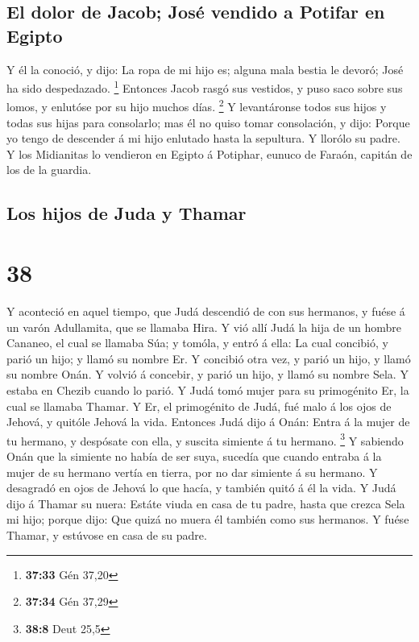 \hypertarget{el-dolor-de-jacob-josuxe9-vendido-a-potifar-en-egipto}{%
\subsection{El dolor de Jacob; José vendido a Potifar en
Egipto}\label{el-dolor-de-jacob-josuxe9-vendido-a-potifar-en-egipto}}

 Y él la conoció, y dijo: La ropa de mi hijo es; alguna
mala bestia le devoró; José ha sido despedazado. \footnote{\textbf{37:33}
  Gén 37,20}  Entonces Jacob rasgó sus vestidos, y puso
saco sobre sus lomos, y enlutóse por su hijo muchos días. \footnote{\textbf{37:34}
  Gén 37,29}  Y levantáronse todos sus hijos y todas sus
hijas para consolarlo; mas él no quiso tomar consolación, y dijo: Porque
yo tengo de descender á mi hijo enlutado hasta la sepultura. Y llorólo
su padre.  Y los Midianitas lo vendieron en Egipto á
Potiphar, eunuco de Faraón, capitán de los de la guardia.

\hypertarget{los-hijos-de-juda-y-thamar}{%
\subsection{Los hijos de Juda y
Thamar}\label{los-hijos-de-juda-y-thamar}}

\hypertarget{section-37}{%
\section{38}\label{section-37}}

 Y aconteció en aquel tiempo, que Judá descendió de con
sus hermanos, y fuése á un varón Adullamita, que se llamaba Hira.
 Y vió allí Judá la hija de un hombre Cananeo, el cual se
llamaba Súa; y tomóla, y entró á ella:  La cual concibió,
y parió un hijo; y llamó su nombre Er.  Y concibió otra
vez, y parió un hijo, y llamó su nombre Onán.  Y volvió á
concebir, y parió un hijo, y llamó su nombre Sela. Y estaba en Chezib
cuando lo parió.  Y Judá tomó mujer para su primogénito
Er, la cual se llamaba Thamar.  Y Er, el primogénito de
Judá, fué malo á los ojos de Jehová, y quitóle Jehová la vida.
 Entonces Judá dijo á Onán: Entra á la mujer de tu
hermano, y despósate con ella, y suscita simiente á tu hermano.
\footnote{\textbf{38:8} Deut 25,5}  Y sabiendo Onán que la
simiente no había de ser suya, sucedía que cuando entraba á la mujer de
su hermano vertía en tierra, por no dar simiente á su hermano.
 Y desagradó en ojos de Jehová lo que hacía, y también
quitó á él la vida.  Y Judá dijo á Thamar su nuera:
Estáte viuda en casa de tu padre, hasta que crezca Sela mi hijo; porque
dijo: Que quizá no muera él también como sus hermanos. Y fuése Thamar, y
estúvose en casa de su padre.


